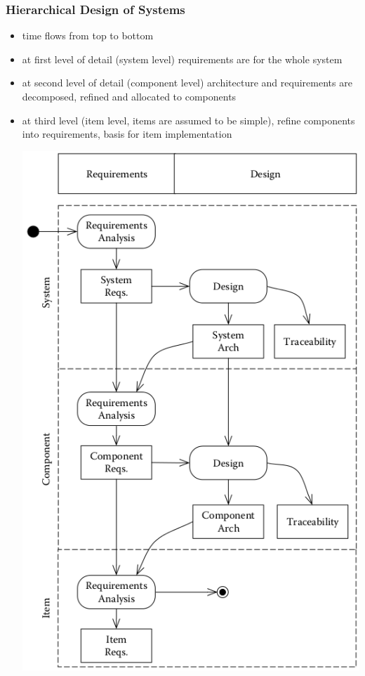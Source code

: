 \documentclass[a4paper, 10pt]{article}
\begin{document}
\subsubsection*{Hierarchical Design of Systems}
\begin{itemize}
    \item time flows from top to bottom
    \item at first level of detail (system level) requirements are for the whole system
    \item at second level of detail (component level) architecture and requirements are decomposed, refined and allocated to components
    \item at third level (item level, items are assumed to be simple), refine components into requirements, basis for item implementation
    \begin{center}
        \includegraphics[width=\linewidth]{images/hierarchical.png}
    \end{center}
\end{itemize}
\end{document}
